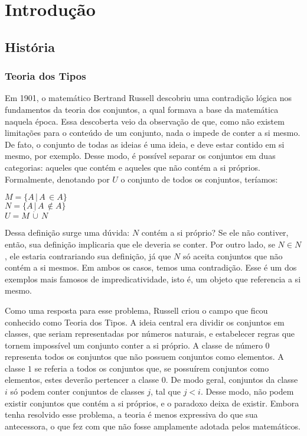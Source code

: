 \documentclass[12pt, oneside, a4paper,english,brazil]{abntex2}
\begin{document}
\imprimircapa
\imprimirfolhaderosto

\tableofcontents* %

\glsaddall
\printglossaries

\textual

\chapter{Introdução}
\section{Hist\'oria}

\subsection*{Teoria dos Tipos}

\qquad Em 1901, o matemático Bertrand Russell descobriu uma contradição lógica nos
fundamentos da teoria dos conjuntos, a qual formava a base da matemática naquela época.
Essa descoberta veio da observação de que, como não existem limitações para o conteúdo
de um conjunto, nada o impede de conter a si mesmo. De fato, o conjunto de todas as
ideias é uma ideia, e deve estar contido em si mesmo, por exemplo. Desse modo, é possível
separar os conjuntos em duas categorias: aqueles que contém e aqueles que não contém a
si próprios. Formalmente, denotando por $U$ o conjunto de todos os conjuntos, teríamos:

\begin{center}
  $M = \{A\, |\, A\, \in A\}$ \\
  $N = \{A\, |\, A\, \notin A\}$ \\
  $U = M\, \dot\cup\, N$
\end{center}

\qquad Dessa definição surge uma dúvida: $N$ contém a si próprio? Se ele não contiver,
então, sua definição implicaria que ele deveria se conter. Por outro lado, se $N \in N$ , ele
estaria contrariando sua definição, já que $N$ só aceita conjuntos que não contém a si
mesmos. Em ambos os casos, temos uma contradição. Esse é um dos exemplos mais
famosos de impredicatividade, isto é, um objeto que referencia a si mesmo.

\qquad Como uma resposta para esse problema, Russell criou o campo que ficou conhecido
como Teoria dos Tipos. A ideia central era dividir os conjuntos em classes, que seriam
representadas por números naturais, e estabelecer regras que tornem impossível um
conjunto conter a si próprio. A classe de número $0$ representa todos os conjuntos que
não possuem conjuntos como elementos. A classe $1$ se referia a todos os conjuntos que,
se possuírem conjuntos como elementos, estes deverão pertencer a classe $0$. De modo
geral, conjuntos da classe $i$ só podem conter conjuntos de classes $j$, tal que $j < i$. Desse
modo, não podem existir conjuntos que contém a si próprios, e o paradoxo deixa de existir.
Embora tenha resolvido esse problema, a teoria é menos expressiva do que sua antecessora,
o que fez com que não fosse amplamente adotada pelos matemáticos.
\end{document}
